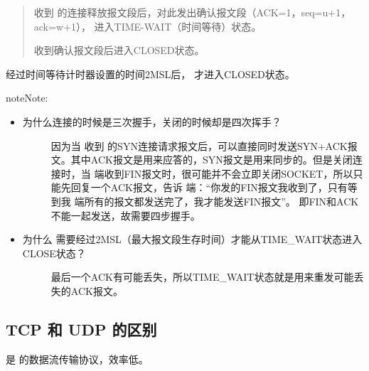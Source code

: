 \documentclass[letterpaper,10pt,english]{sphinxmanual}
\begin{document}
\begin{itemize}
\begin{description}
\begin{quote}
 收到  的连接释放报文段后，对此发出确认报文段（ACK=1，seq=u+1，ack=w+1），  进入TIME-WAIT（时间等待）状态。

 收到确认报文段后进入CLOSED状态。
\end{quote}

经过时间等待计时器设置的时间2MSL后，  才进入CLOSED状态。

\end{description}

\end{itemize}

\begin{sphinxadmonition}{note}{Note:}\begin{itemize}
\item {} \begin{description}
\item[{为什么连接的时候是三次握手，关闭的时候却是四次挥手？}] \leavevmode
因为当  收到  的SYN连接请求报文后，可以直接同时发送SYN+ACK报文。其中ACK报文是用来应答的，SYN报文是用来同步的。但是关闭连接时，当  端收到FIN报文时，很可能并不会立即关闭SOCKET，所以只能先回复一个ACK报文，告诉  端：“你发的FIN报文我收到了，只有等到我  端所有的报文都发送完了，我才能发送FIN报文”。
即FIN和ACK不能一起发送，故需要四步握手。

\end{description}

\item {} \begin{description}
\item[{为什么  需要经过2MSL（最大报文段生存时间）才能从TIME\_WAIT状态进入CLOSE状态？}] \leavevmode
最后一个ACK有可能丢失，所以TIME\_WAIT状态就是用来重发可能丢失的ACK报文。

\end{description}

\end{itemize}
\end{sphinxadmonition}


\subsection{TCP 和 UDP 的区别}
\label{\detokenize{computerNetwork/02_tcp:tcp-udp}}
 是  的数据流传输协议，效率低。
\end{document}
